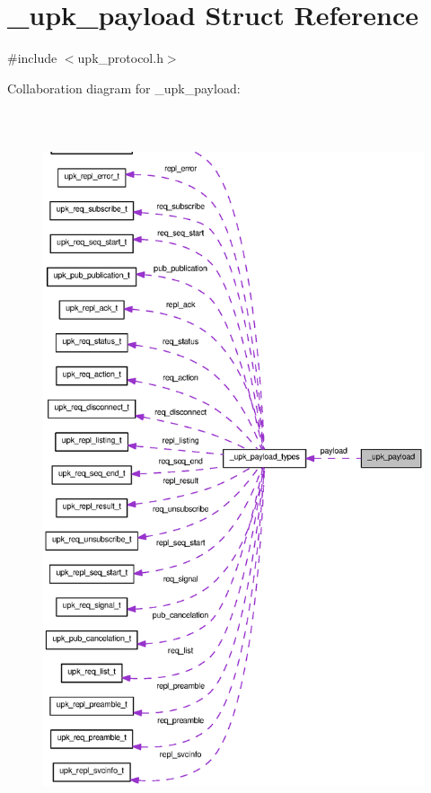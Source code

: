 \section{\_\-upk\_\-payload Struct Reference}
\label{struct__upk__payload}


{\ttfamily \#include $<$upk\_\-protocol.h$>$}



Collaboration diagram for \_\-upk\_\-payload:\nopagebreak
\begin{figure}[H]
\begin{center}
\leavevmode
\includegraphics[height=600pt]{struct__upk__payload__coll__graph}
\end{center}
\end{figure}
